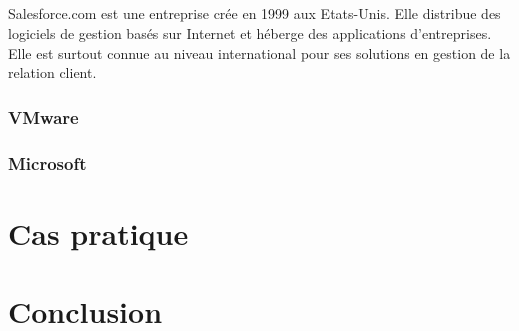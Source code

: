 \documentclass[a4paper,12pt]{report}
\begin{document}
\begin{onehalfspace}
	\paragraph*{}
	Salesforce.com est une entreprise crée en 1999 aux Etats-Unis. Elle distribue des logiciels de gestion basés sur Internet et héberge des applications d'entreprises. Elle est surtout connue au niveau international pour ses solutions en gestion de la relation client.
	
	\subsection{VMware}


	\subsection{Microsoft}


	\chapter{Cas pratique}


	\chapter*{Conclusion}
	

	
	\tableofcontents
	\newpage

	\end{onehalfspace}
\end{document}
